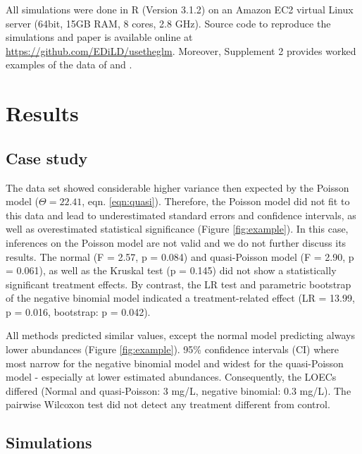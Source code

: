 \documentclass[twocolumn, natbib]{svjour3}
\begin{document}
All simulations were done in R (Version 3.1.2) \citep{r_core_team_r:_2014} on an Amazon EC2 virtual Linux server (64bit, 15GB RAM, 8 cores, 2.8 GHz).
Source code to reproduce the simulations and paper is available online at \url{https://github.com/EDiLD/usetheglm}.
Moreover, Supplement 2 provides worked examples of the data of \citet{brock_minimum_2015} and \citet{weber_short-term_1989}.



\section{Results}
\label{sec:results}
\subsection{Case study}
The data set showed considerable higher variance then expected by the Poisson model ($\Theta = 22.41$, eqn. \ref{eqn:quasi}). 
Therefore, the Poisson model did not fit to this data and lead to underestimated standard errors and confidence intervals, as well as overestimated statistical significance (Figure \ref{fig:example}).
In this case, inferences on the Poisson model are not valid and we do not further discuss its results.
The normal (F = 2.57, p = 0.084) and quasi-Poisson model (F = 2.90, p = 0.061), as well as the Kruskal test (p =  0.145) did not show a statistically significant treatment effects.
By contrast, the LR test and parametric bootstrap of the negative binomial model indicated a treatment-related effect (LR = 13.99, p = 0.016, bootstrap: p = 0.042).

All methods predicted similar values, except the normal model predicting always lower abundances (Figure \ref{fig:example}). 
95\% confidence intervals (CI) where most narrow for the negative binomial model and widest for the quasi-Poisson model - especially at lower estimated abundances.
Consequently, the LOECs differed (Normal and quasi-Poisson: 3 mg/L, negative binomial: 0.3 mg/L).
The pairwise Wilcoxon test did not detect any treatment different from control.


\subsection{Simulations}
\end{document}
